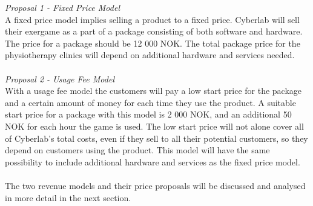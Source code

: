 \emph{Proposal 1 - Fixed Price Model}\\  
A fixed price model implies selling a product to a fixed price. Cyberlab will sell their exergame as a part of a package consisting of both software and hardware. The price for a package should be 12 000 NOK. The total package price for the physiotherapy clinics will depend on additional hardware and services needed. \\ \\
\emph{Proposal 2 - Usage Fee Model}\\
With a usage fee model the customers will pay a low start price for the package and a certain amount of money for each time they use the product. A suitable start price for a package with this model is 2 000 NOK, and an additional 50 NOK for each hour the game is used. The low start price will not alone cover all of Cyberlab's total costs, even if they sell to all their potential customers, so they depend on customers using the product. This model will have the same possibility to include additional hardware and services as the fixed price model. \\ \\
The two revenue models and their price proposals will be discussed and analysed in more detail in the next section.

